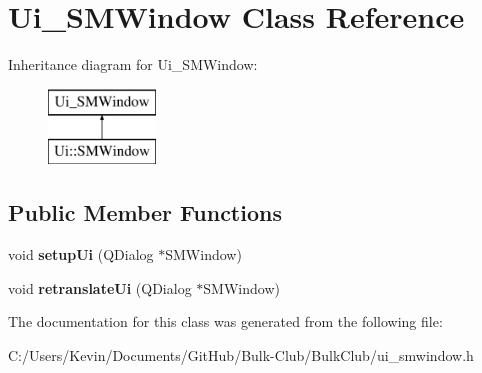 \hypertarget{class_ui___s_m_window}{}\section{Ui\+\_\+\+S\+M\+Window Class Reference}
\label{class_ui___s_m_window}
Inheritance diagram for Ui\+\_\+\+S\+M\+Window\+:\begin{figure}[H]
\begin{center}
\leavevmode
\includegraphics[height=2.000000cm]{class_ui___s_m_window}
\end{center}
\end{figure}
\subsection*{Public Member Functions}
\begin{DoxyCompactItemize}
\item 
\mbox{\label{class_ui___s_m_window_a20e094c77ae12608c8e878dffafb44d1}} 
void {\bfseries setup\+Ui} (Q\+Dialog $\ast$S\+M\+Window)
\item 
\mbox{\label{class_ui___s_m_window_a8a2e726fbfb05f26986bfecd809e4b7b}} 
void {\bfseries retranslate\+Ui} (Q\+Dialog $\ast$S\+M\+Window)
\end{DoxyCompactItemize}


The documentation for this class was generated from the following file\+:\begin{DoxyCompactItemize}
\item 
C\+:/\+Users/\+Kevin/\+Documents/\+Git\+Hub/\+Bulk-\/\+Club/\+Bulk\+Club/ui\+\_\+smwindow.\+h\end{DoxyCompactItemize}
